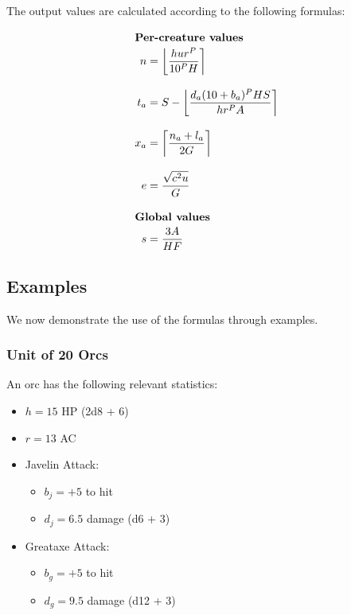 The output values are calculated according to the following formulas:

\begin{align*}
\intertext{\textbf{Per-creature values}}
    n   &=
        \left\lfloor
            \frac
                {h u r^P}
                {10^P H}
        \right\rceil \\[2ex]
    t_a &=
        S -
        \left\lfloor
            \frac
                {d_a (10 + b_{a})^P H S}
                {h r^P A}
        \right\rceil \\[2ex]
    x_a &= \left\lceil\frac
        {n_a + l_a}
        {2 G}
        \right\rceil \\[2ex]
    e   &=
        \frac
            {\sqrt{c^2 u}}
            {G} \\[2ex]
\intertext{\textbf{Global values}}
    s   &=
        \frac
            {3 A}
            {H F}
\end{align*}


\subsection{Examples}\label{sec:examples}

We now demonstrate the use of the formulas through examples.

\subsubsection{Unit of 20 Orcs}

An orc has the following relevant statistics:
\begin{itemize}
    \item $h = 15$ HP (2d8 + 6)
    \item $r = 13$ AC
    \item Javelin Attack:
        \begin{itemize}
            \item $b_j = +5$ to hit
            \item $d_j = 6.5$ damage (d6 + 3)
        \end{itemize}
    \item Greataxe Attack:
        \begin{itemize}
            \item $b_g = +5$ to hit
            \item $d_g = 9.5$ damage (d12 + 3)
        \end{itemize}
\end{itemize}

